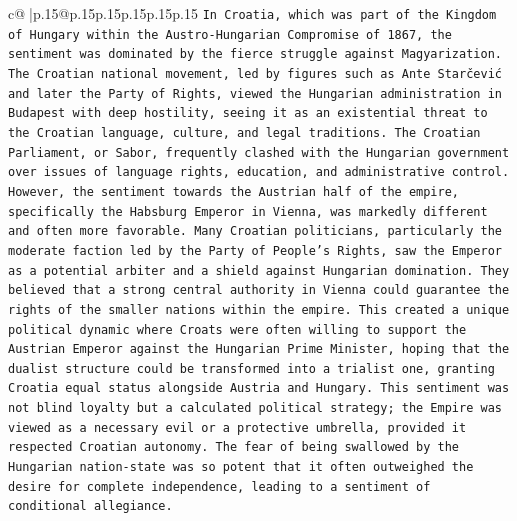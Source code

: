 \documentclass{article}
\begin{document}
{\begin{supertabular}{c@{$\;$}|p{.15\linewidth}@{}p{.15\linewidth}p{.15\linewidth}p{.15\linewidth}p{.15\linewidth}p{.15\linewidth}}
{{{\texttt{In Croatia, which was part of the Kingdom of Hungary within the Austro{-}Hungarian Compromise of 1867, the sentiment was dominated by the fierce struggle against Magyarization. The Croatian national movement, led by figures such as Ante Starčević and later the Party of Rights, viewed the Hungarian administration in Budapest with deep hostility, seeing it as an existential threat to the Croatian language, culture, and legal traditions. The Croatian Parliament, or Sabor, frequently clashed with the Hungarian government over issues of language rights, education, and administrative control. However, the sentiment towards the Austrian half of the empire, specifically the Habsburg Emperor in Vienna, was markedly different and often more favorable. Many Croatian politicians, particularly the moderate faction led by the Party of People's Rights, saw the Emperor as a potential arbiter and a shield against Hungarian domination. They believed that a strong central authority in Vienna could guarantee the rights of the smaller nations within the empire. This created a unique political dynamic where Croats were often willing to support the Austrian Emperor against the Hungarian Prime Minister, hoping that the dualist structure could be transformed into a trialist one, granting Croatia equal status alongside Austria and Hungary. This sentiment was not blind loyalty but a calculated political strategy; the Empire was viewed as a necessary evil or a protective umbrella, provided it respected Croatian autonomy. The fear of being swallowed by the Hungarian nation{-}state was so potent that it often outweighed the desire for complete independence, leading to a sentiment of conditional allegiance.} \\
\\ 
}}}
\end{supertabular}}
\end{document}
